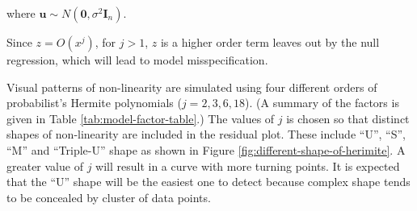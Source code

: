 \documentclass[]{interact}
\theoremstyle{plain}%
\theoremstyle{definition}
\theoremstyle{remark}
\begin{document}
\noindent where
\(\boldsymbol{u} \sim N(\boldsymbol{0}, \sigma^2\boldsymbol{I}_n)\).

Since \(z = O(x^j)\), for \(j > 1\), \(z\) is a higher order term leaves
out by the null regression, which will lead to model misspecification.

Visual patterns of non-linearity are simulated using four different
orders of probabilist's Hermite polynomials (\(j = 2, 3, 6, 18\)). (A
summary of the factors is given in Table \ref{tab:model-factor-table}.)
The values of \(j\) is chosen so that distinct shapes of non-linearity
are included in the residual plot. These include ``U'', ``S'', ``M'' and
``Triple-U'' shape as shown in Figure
\ref{fig:different-shape-of-herimite}. A greater value of \(j\) will
result in a curve with more turning points. It is expected that the
``U'' shape will be the easiest one to detect because complex shape
tends to be concealed by cluster of data points.

\begin{table}

\caption{\label{tab:model-factor-table}Levels of the factors used in data collection periods I, II, III.}
\centering
{}
\end{table}
\end{document}
